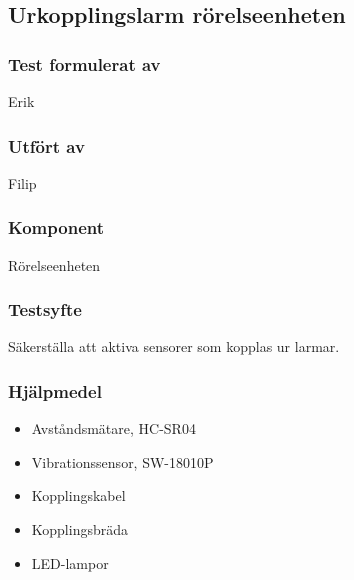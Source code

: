 \clearpage
\subsection{Urkopplingslarm rörelseenheten}
\label{test:UrkopplingMotion}

\setlength{\columnsep}{1cm}




\begin{multicols}{2}
\subsubsection*{Test formulerat av}
Erik

\subsubsection*{Utfört av}
Filip


\end{multicols}
\subsubsection*{Komponent}
Rörelseenheten


\subsubsection*{Testsyfte}
Säkerställa att aktiva sensorer som kopplas ur larmar.

\subsubsection*{Hjälpmedel}
\begin{itemize}
	\item Avståndsmätare, HC-SR04
	\item Vibrationssensor, SW-18010P
	\item Kopplingskabel
	\item Kopplingsbräda
	\item LED-lampor
\end{itemize}



